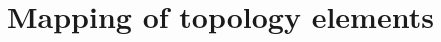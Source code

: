 	\section{Mapping of topology elements}
	\label{sec:rel-work-mapping-topo-elem}

	\cite{Gharaibeh:2017:LRG:3131365.3131380, Huffaker:2014:DDR:2656877.2656879, 8002903}

